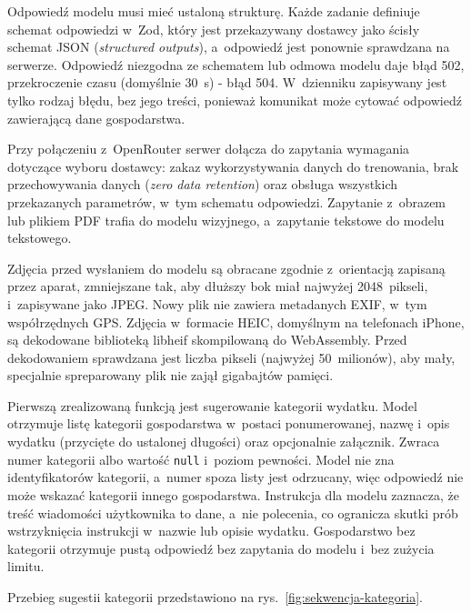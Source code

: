Odpowiedź modelu musi mieć ustaloną strukturę. Każde zadanie definiuje schemat odpowiedzi w~Zod, który jest przekazywany dostawcy jako ścisły schemat JSON (\emph{structured outputs}), a~odpowiedź jest ponownie sprawdzana na serwerze. Odpowiedź niezgodna ze schematem lub odmowa modelu daje błąd 502, przekroczenie czasu (domyślnie 30~s) - błąd 504. W~dzienniku zapisywany jest tylko rodzaj błędu, bez jego treści, ponieważ komunikat może cytować odpowiedź zawierającą dane gospodarstwa.

Przy połączeniu z~OpenRouter serwer dołącza do zapytania wymagania dotyczące wyboru dostawcy: zakaz wykorzystywania danych do trenowania, brak przechowywania danych (\emph{zero data retention}) oraz obsługa wszystkich przekazanych parametrów, w~tym schematu odpowiedzi. Zapytanie z~obrazem lub plikiem PDF trafia do modelu wizyjnego, a~zapytanie tekstowe do modelu tekstowego.

Zdjęcia przed wysłaniem do modelu są obracane zgodnie z~orientacją zapisaną przez aparat, zmniejszane tak, aby dłuższy bok miał najwyżej 2048~pikseli, i~zapisywane jako JPEG. Nowy plik nie zawiera metadanych EXIF, w~tym współrzędnych GPS. Zdjęcia w~formacie HEIC, domyślnym na telefonach iPhone, są dekodowane biblioteką libheif skompilowaną do WebAssembly. Przed dekodowaniem sprawdzana jest liczba pikseli (najwyżej 50~milionów), aby mały, specjalnie spreparowany plik nie zajął gigabajtów pamięci.

Pierwszą zrealizowaną funkcją jest sugerowanie kategorii wydatku. Model otrzymuje listę kategorii gospodarstwa w~postaci ponumerowanej, nazwę i~opis wydatku (przycięte do ustalonej długości) oraz opcjonalnie załącznik. Zwraca numer kategorii albo wartość \texttt{null} i~poziom pewności. Model nie zna identyfikatorów kategorii, a~numer spoza listy jest odrzucany, więc odpowiedź nie może wskazać kategorii innego gospodarstwa. Instrukcja dla modelu zaznacza, że treść wiadomości użytkownika to dane, a~nie polecenia, co ogranicza skutki prób wstrzyknięcia instrukcji w~nazwie lub opisie wydatku. Gospodarstwo bez kategorii otrzymuje pustą odpowiedź bez zapytania do modelu i~bez zużycia limitu.

Przebieg sugestii kategorii przedstawiono na rys.~\ref{fig:sekwencja-kategoria}.

